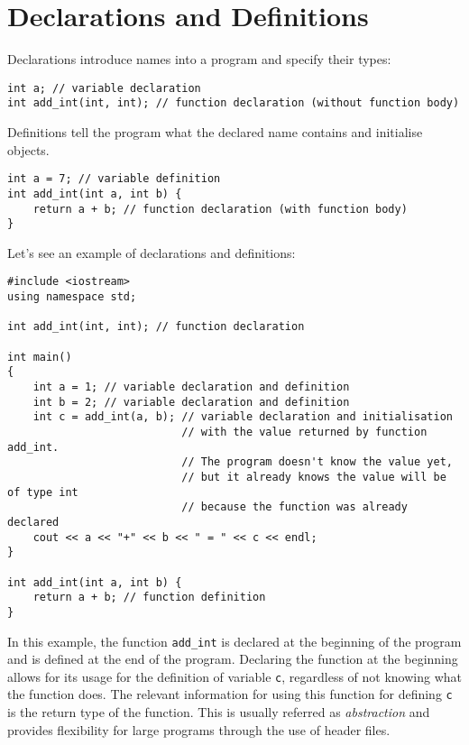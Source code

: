 \documentclass{article}
\begin{document}
\section{Declarations and Definitions}

Declarations introduce names into a program and specify their types:

\begin{verbatim}
int a; // variable declaration
int add_int(int, int); // function declaration (without function body)
\end{verbatim}

Definitions tell the program what the declared name contains and initialise objects.


\begin{verbatim}
int a = 7; // variable definition
int add_int(int a, int b) {
    return a + b; // function declaration (with function body)
}
\end{verbatim}

Let's see an example of declarations and definitions:

\begin{verbatim}
#include <iostream>
using namespace std;

int add_int(int, int); // function declaration

int main()
{
    int a = 1; // variable declaration and definition
    int b = 2; // variable declaration and definition
    int c = add_int(a, b); // variable declaration and initialisation
                           // with the value returned by function add_int.
                           // The program doesn't know the value yet,
                           // but it already knows the value will be of type int
                           // because the function was already declared
    cout << a << "+" << b << " = " << c << endl;  
}

int add_int(int a, int b) {
    return a + b; // function definition
}
\end{verbatim}

In this example, the function \verb|add_int| is declared at the beginning of the program and is defined at the end of the program. Declaring the function at the beginning allows for its usage for the definition of variable \verb|c|, regardless of not knowing what the function does. The relevant information for using this function for defining \verb|c| is the return type of the function. This is usually referred as \textit{abstraction} and provides flexibility for large programs through the use of header files.
\end{document}
